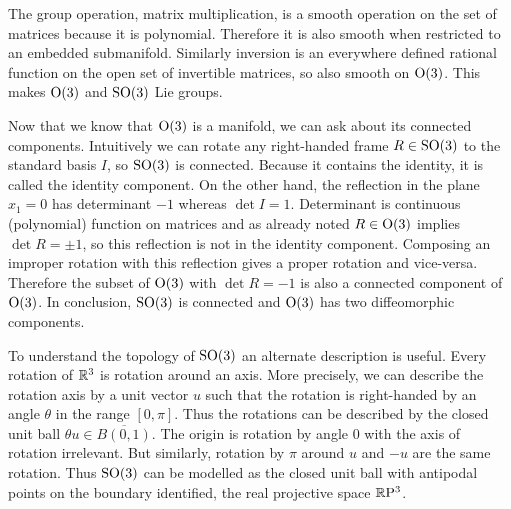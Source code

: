 The group operation, matrix multiplication, is a smooth operation on the set of matrices because it is polynomial.
Therefore it is also smooth when restricted to an embedded submanifold.
Similarly inversion is an everywhere defined rational function on the open set of invertible matrices, so also smooth on $\mathrm{O}(3)$.
This makes $\mathrm{O}(3)$ and $\mathrm{SO}(3)$ Lie groups.

Now that we know that $\mathrm{O}(3)$ is a manifold, we can ask about its connected components.
Intuitively we can rotate any right-handed frame $R \in \mathrm{SO}(3)$ to the standard basis $I$, so $\mathrm{SO}(3)$ is connected.
Because it contains the identity, it is called the identity component.
On the other hand, the reflection in the plane $x_1 = 0$ has determinant $-1$ whereas $\det I = 1$.
Determinant is continuous (polynomial) function on matrices and as already noted $R \in \mathrm{O}(3)$ implies $\det R = \pm 1$, so this reflection is not in the identity component.
Composing an improper rotation with this reflection gives a proper rotation and vice-versa. Therefore the subset of $\mathrm{O}(3)$ with $\det R = -1$ is also a connected component of $\mathrm{O}(3)$.
In conclusion, $\mathrm{SO}(3)$ is connected and $\mathrm{O}(3)$ has two diffeomorphic components.

To understand the topology of $\mathrm{SO}(3)$ an alternate description is useful.
Every rotation of $\mathbb{R}^3$ is rotation around an axis.
More precisely, we can describe the rotation axis by a unit vector $u$ such that the rotation is right-handed by an angle $\theta$ in the range $[0,\pi]$.
Thus the rotations can be described by the closed unit ball $\theta u \in \overline{B(0,1)}$.
The origin is rotation by angle $0$ with the axis of rotation irrelevant.
But similarly, rotation by $\pi$ around $u$ and $-u$ are the same rotation.
Thus $\mathrm{SO}(3)$ can be modelled as the closed unit ball with antipodal points on the boundary identified, the real projective space $\mathbb{R}\mathrm{P}^3$.

